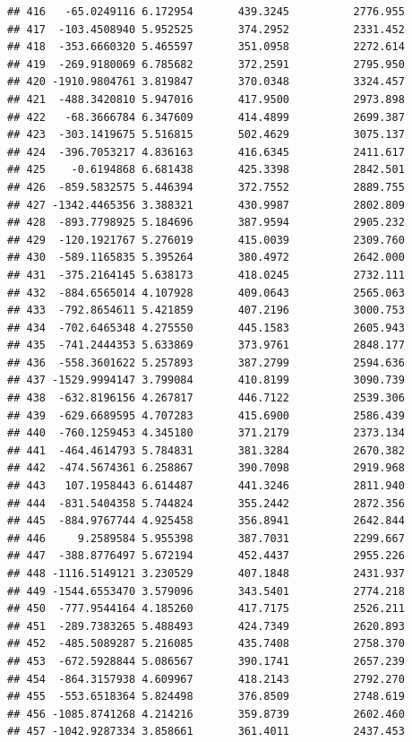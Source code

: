 \documentclass[
]{article}
\begin{document}
\begin{verbatim}
## 416   -65.0249116 6.172954       439.3245          2776.955
## 417  -103.4508940 5.952525       374.2952          2331.452
## 418  -353.6660320 5.465597       351.0958          2272.614
## 419  -269.9180069 6.785682       372.2591          2795.950
## 420 -1910.9804761 3.819847       370.0348          3324.457
## 421  -488.3420810 5.947016       417.9500          2973.898
## 422   -68.3666784 6.347609       414.4899          2699.387
## 423  -303.1419675 5.516815       502.4629          3075.137
## 424  -396.7053217 4.836163       416.6345          2411.617
## 425    -0.6194868 6.681438       425.3398          2842.501
## 426  -859.5832575 5.446394       372.7552          2889.755
## 427 -1342.4465356 3.388321       430.9987          2802.809
## 428  -893.7798925 5.184696       387.9594          2905.232
## 429  -120.1921767 5.276019       415.0039          2309.760
## 430  -589.1165835 5.395264       380.4972          2642.000
## 431  -375.2164145 5.638173       418.0245          2732.111
## 432  -884.6565014 4.107928       409.0643          2565.063
## 433  -792.8654611 5.421859       407.2196          3000.753
## 434  -702.6465348 4.275550       445.1583          2605.943
## 435  -741.2444353 5.633869       373.9761          2848.177
## 436  -558.3601622 5.257893       387.2799          2594.636
## 437 -1529.9994147 3.799084       410.8199          3090.739
## 438  -632.8196156 4.267817       446.7122          2539.306
## 439  -629.6689595 4.707283       415.6900          2586.439
## 440  -760.1259453 4.345180       371.2179          2373.134
## 441  -464.4614793 5.784831       381.3284          2670.382
## 442  -474.5674361 6.258867       390.7098          2919.968
## 443   107.1958443 6.614487       441.3246          2811.940
## 444  -831.5404358 5.744824       355.2442          2872.356
## 445  -884.9767744 4.925458       356.8941          2642.844
## 446     9.2589584 5.955398       387.7031          2299.667
## 447  -388.8776497 5.672194       452.4437          2955.226
## 448 -1116.5149121 3.230529       407.1848          2431.937
## 449 -1544.6553470 3.579096       343.5401          2774.218
## 450  -777.9544164 4.185260       417.7175          2526.211
## 451  -289.7383265 5.488493       424.7349          2620.893
## 452  -485.5089287 5.216085       435.7408          2758.370
## 453  -672.5928844 5.086567       390.1741          2657.239
## 454  -864.3157938 4.609967       418.2143          2792.270
## 455  -553.6518364 5.824498       376.8509          2748.619
## 456 -1085.8741268 4.214216       359.8739          2602.460
## 457 -1042.9287334 3.858661       361.4011          2437.453

\end{verbatim}
\end{document}
